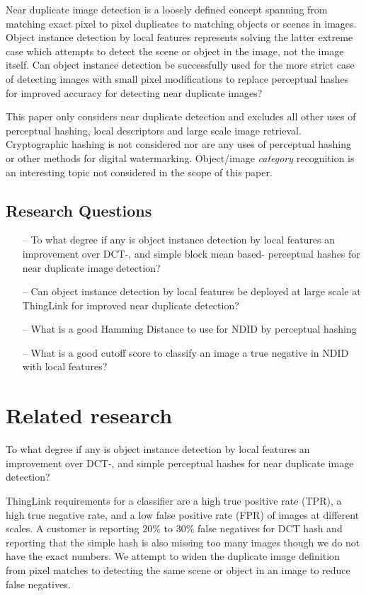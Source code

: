 \documentclass[english,12pt,a4paper,pdftex,elec,utf8]{aaltothesis}
\begin{document}
Near duplicate image detection is a loosely defined concept spanning from matching exact pixel to pixel duplicates to matching objects or scenes in images. Object instance detection by local features represents solving the latter extreme case which attempts to detect the scene or object in the image, not the image itself. Can object instance detection be successfully used for the more strict case of detecting images with small pixel modifications to replace perceptual hashes for improved accuracy for detecting near duplicate images?

This paper only considers near duplicate detection and excludes all other uses of perceptual hashing, local descriptors and large scale image retrieval. Cryptographic hashing is not considered nor are any uses of perceptual hashing or other methods for digital watermarking. Object/image \emph{category} recognition is an interesting topic not considered in the scope of this paper.

\subsection{Research Questions}
\begin{itemize}
\item[--] To what degree if any is object instance detection by local features an improvement over DCT-, and simple block mean based- perceptual hashes for near duplicate image detection?
\item[--] Can object instance detection by local features be deployed at large scale at ThingLink for improved near duplicate detection?
\item[--] What is a good Hamming Distance to use for NDID by perceptual hashing
\item[--] What is a good cutoff score to classify an image a true negative in NDID with local features?
\end{itemize}

\clearpage

\section{Related research}
To what degree if any is object instance detection by local features an improvement over DCT-, and simple perceptual hashes for near duplicate image detection?

ThingLink requirements for a classifier are a high true positive rate (TPR), a high true negative rate, and a low false positive rate (FPR) of images at different scales. A customer is reporting 20\% to 30\% false negatives for DCT hash and reporting that the simple hash is also missing too many images though we do not have the exact numbers. We attempt to widen the duplicate image definition from pixel matches to detecting the same scene or object in an image to reduce false negatives.
\end{document}
